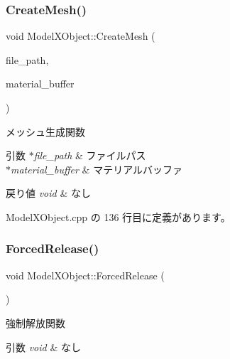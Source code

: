 \subsubsection{\texorpdfstring{Create\+Mesh()}{CreateMesh()}}
{\footnotesize\ttfamily void Model\+X\+Object\+::\+Create\+Mesh (\begin{DoxyParamCaption}\item[{std\+::string $\ast$}]{file\+\_\+path,  }\item[{L\+P\+D3\+D\+X\+B\+U\+F\+F\+ER $\ast$}]{material\+\_\+buffer }\end{DoxyParamCaption})\hspace{0.3cm}{\ttfamily [private]}}



メッシュ生成関数 


\begin{DoxyParams}{引数}
{\em $\ast$file\+\_\+path} & ファイルパス \\
\hline
{\em $\ast$material\+\_\+buffer} & マテリアルバッファ \\
\hline
\end{DoxyParams}

\begin{DoxyRetVals}{戻り値}
{\em void} & なし \\
\hline
\end{DoxyRetVals}


 Model\+X\+Object.\+cpp の 136 行目に定義があります。

\mbox{\label{class_model_x_object_a6035084c786294b69a76e34724504eb5}} 
\subsubsection{\texorpdfstring{Forced\+Release()}{ForcedRelease()}}
{\footnotesize\ttfamily void Model\+X\+Object\+::\+Forced\+Release (\begin{DoxyParamCaption}{ }\end{DoxyParamCaption})}



強制解放関数 


\begin{DoxyParams}{引数}
{\em void} & なし \\
\hline
\end{DoxyParams}

